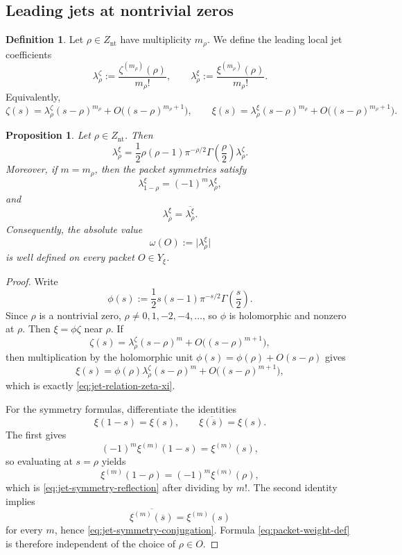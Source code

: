 \documentclass[11pt,a4paper]{article}
\numberwithin{equation}{section}
\newtheorem{proposition}[theorem]{Proposition}
\theoremstyle{definition}
\newtheorem{definition}[theorem]{Definition}
\theoremstyle{remark}
\begin{document}
\subsection{Leading jets at nontrivial zeros}

\begin{definition}
Let $\rho\in Z_{\mathrm{nt}}$ have multiplicity $m_\rho$.  We define the leading local jet coefficients
\[
\lambda_\rho^{\zeta}:=\frac{\zeta^{(m_\rho)}(\rho)}{m_\rho!},
\qquad
\lambda_\rho^{\xi}:=\frac{\xi^{(m_\rho)}(\rho)}{m_\rho!}.
\]
Equivalently,
\[
\zeta(s)=\lambda_\rho^{\zeta}(s-\rho)^{m_\rho}+O\bigl((s-\rho)^{m_\rho+1}\bigr),
\qquad
\xi(s)=\lambda_\rho^{\xi}(s-\rho)^{m_\rho}+O\bigl((s-\rho)^{m_\rho+1}\bigr).
\]
\end{definition}

\begin{proposition}\label{prop:leading-jets-nontrivial}
Let $\rho\in Z_{\mathrm{nt}}$.  Then
\begin{equation}\label{eq:jet-relation-zeta-xi}
\lambda_\rho^{\xi}=\frac12\rho(\rho-1)\pi^{-\rho/2}\Gamma\!\left(\frac{\rho}{2}\right)\lambda_\rho^{\zeta}.
\end{equation}
Moreover, if $m=m_\rho$, then the packet symmetries satisfy
\begin{equation}\label{eq:jet-symmetry-reflection}
\lambda_{1-\rho}^{\xi}=(-1)^m\lambda_\rho^{\xi},
\end{equation}
and
\begin{equation}\label{eq:jet-symmetry-conjugation}
\lambda_{\overline\rho}^{\xi}=\overline{\lambda_\rho^{\xi}}.
\end{equation}
Consequently, the absolute value
\begin{equation}\label{eq:packet-weight-def}
\omega(O):=\bigl|\lambda_\rho^{\xi}\bigr|
\end{equation}
is well defined on every packet $O\in Y_\xi$.
\end{proposition}

\begin{proof}
Write
\[
\phi(s):=\frac12 s(s-1)\pi^{-s/2}\Gamma\!\left(\frac{s}{2}\right).
\]
Since $\rho$ is a nontrivial zero, $\rho\neq 0,1,-2,-4,\dots$, so $\phi$ is holomorphic and nonzero at $\rho$.  Then $\xi=\phi\zeta$ near $\rho$.  If
\[
\zeta(s)=\lambda_\rho^{\zeta}(s-\rho)^m+O\bigl((s-\rho)^{m+1}\bigr),
\]
then multiplication by the holomorphic unit $\phi(s)=\phi(\rho)+O(s-\rho)$ gives
\[
\xi(s)=\phi(\rho)\lambda_\rho^{\zeta}(s-\rho)^m+O\bigl((s-\rho)^{m+1}\bigr),
\]
which is exactly \eqref{eq:jet-relation-zeta-xi}.

For the symmetry formulas, differentiate the identities
\[
\xi(1-s)=\xi(s),
\qquad
\overline{\xi(\overline s)}=\xi(s).
\]
The first gives
\[
(-1)^m\xi^{(m)}(1-s)=\xi^{(m)}(s),
\]
so evaluating at $s=\rho$ yields
\[
\xi^{(m)}(1-\rho)=(-1)^m\xi^{(m)}(\rho),
\]
which is \eqref{eq:jet-symmetry-reflection} after dividing by $m!$.  The second identity implies
\[
\overline{\xi^{(m)}(\overline s)}=\xi^{(m)}(s)
\]
for every $m$, hence \eqref{eq:jet-symmetry-conjugation}.  Formula \eqref{eq:packet-weight-def} is therefore independent of the choice of $\rho\in O$.
\end{proof}
\end{document}

